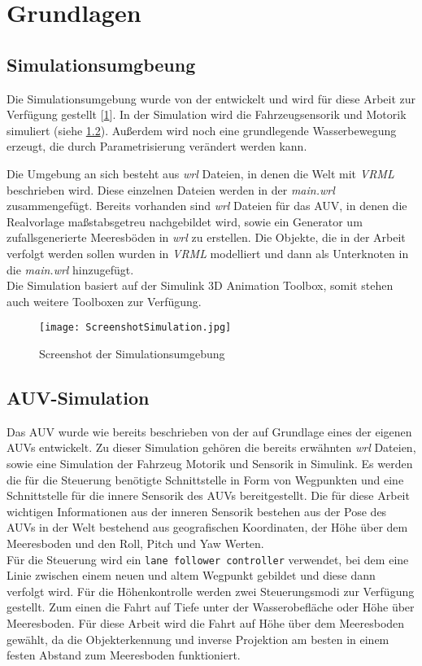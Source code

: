 \section{Grundlagen}
\subsection{Simulationsumgbeung}
Die Simulationsumgebung wurde von der \atlas entwickelt und wird für diese Arbeit zur Verfügung gestellt [\ref{screenSim}].
In der Simulation wird die Fahrzeugsensorik und Motorik simuliert (siehe \ref{sec_auvSimGrundlage}). Außerdem wird noch eine grundlegende Wasserbewegung erzeugt, die durch Parametrisierung verändert werden kann.\\

Die Umgebung an sich besteht aus \textit{wrl} Dateien, in denen die Welt mit \textit{VRML} beschrieben wird. Diese einzelnen Dateien werden in der \textit{main.wrl} zusammengefügt. Bereits vorhanden sind \textit{wrl} Dateien für das AUV, in denen die Realvorlage maßstabsgetreu nachgebildet wird, sowie ein Generator um zufallsgenerierte Meeresböden in \textit{wrl} zu erstellen. Die Objekte, die in der Arbeit verfolgt werden sollen wurden in \textit{VRML} modelliert und dann als Unterknoten in die \textit{main.wrl} hinzugefügt.\\
Die Simulation basiert auf der \matlab Simulink 3D Animation Toolbox, somit stehen auch weitere \matlab Toolboxen zur Verfügung. 
\begin{figure}[H]
\texttt{[image: ScreenshotSimulation.jpg]}
\caption{Screenshot der Simulationsumgebung}
\label{screenSim}
\end{figure}
\subsection{AUV-Simulation}
\label{sec_auvSimGrundlage}
Das AUV wurde wie bereits beschrieben von der \atlas auf Grundlage eines der eigenen AUVs entwickelt. Zu dieser Simulation gehören die bereits erwähnten \textit{wrl} Dateien, sowie eine Simulation der Fahrzeug Motorik und Sensorik in \matlab Simulink. Es werden die für die Steuerung benötigte Schnittstelle in Form von Wegpunkten und eine Schnittstelle für die innere Sensorik des AUVs bereitgestellt. Die für diese Arbeit wichtigen Informationen aus der inneren Sensorik bestehen aus der Pose des AUVs in der Welt bestehend aus geografischen Koordinaten, der Höhe über dem Meeresboden und den Roll, Pitch und Yaw Werten.\\
Für die Steuerung wird ein \texttt{lane follower controller} verwendet, bei dem eine Linie zwischen einem neuen und altem Wegpunkt gebildet und diese dann verfolgt wird. Für die Höhenkontrolle werden zwei Steuerungsmodi zur Verfügung gestellt. Zum einen die Fahrt auf Tiefe unter der Wasserobefläche oder Höhe über Meeresboden. Für diese Arbeit wird die Fahrt auf Höhe über dem Meeresboden gewählt, da die Objekterkennung und inverse Projektion am besten in einem festen Abstand zum Meeresboden funktioniert.

